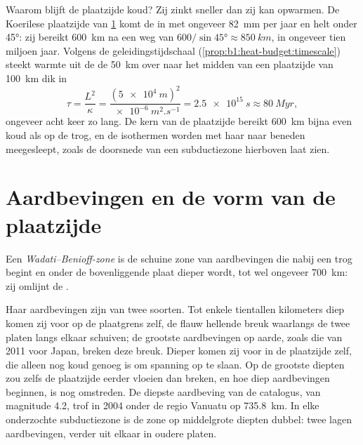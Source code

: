 Waarom blijft de plaatzijde koud? Zij zinkt sneller dan zij kan opwarmen. De Koerilese plaatzijde van \cref{sec:b1:active-margins:seismicity} komt de  in met ongeveer \qty{82}{mm} per jaar en helt onder \ang{45}: zij bereikt \qty{600}{km} na een weg van $600/\sin\ang{45} \approx \qty{850}{km}$, in ongeveer tien miljoen jaar. Volgens de geleidingstijdschaal (\cref{prop:b1:heat-budget:timescale}) steekt warmte uit de  de \qty{50}{km} over naar het midden van een plaatzijde van \qty{100}{km} dik in
\[
  \tau = \frac{L^2}{\kappa} = \frac{(\qty{5e4}{m})^2}{\qty{e-6}{m^2.s^{-1}}}
  = \qty{2.5e15}{s} \approx \qty{80}{Myr},
\]
ongeveer acht keer zo lang. De kern van de plaatzijde bereikt \qty{600}{km} bijna even koud als op de trog, en de isothermen worden met haar naar beneden meegesleept, zoals de doorsnede van een subductiezone hierboven laat zien.

\section{Aardbevingen en de vorm van de plaatzijde}\label{sec:b1:active-margins:seismicity}

\begin{definition}\label{def:b1:active-margins:wadati-benioff}
Een \emph{Wadati--Benioff-zone} is de schuine zone van aardbevingen die nabij een trog begint en onder de bovenliggende plaat dieper wordt, tot wel ongeveer \qty{700}{km}: zij omlijnt de .
\end{definition}

Haar aardbevingen zijn van twee soorten. Tot enkele tientallen kilometers diep komen zij voor op de plaatgrens zelf, de flauw hellende breuk waarlangs de twee platen langs elkaar schuiven; de grootste aardbevingen op aarde, zoals die van 2011 voor Japan, breken deze breuk. Dieper komen zij voor in de plaatzijde zelf, die alleen nog koud genoeg is om spanning op te slaan. Op de grootste diepten zou zelfs de plaatzijde eerder vloeien dan breken, en hoe diep aardbevingen beginnen, is nog omstreden. De diepste aardbeving van de catalogus, van magnitude 4.2, trof in 2004 onder de regio Vanuatu op \qty{735.8}{km}. In elke onderzochte subductiezone is de zone op middelgrote diepten dubbel: twee lagen aardbevingen, verder uit elkaar in oudere platen.


